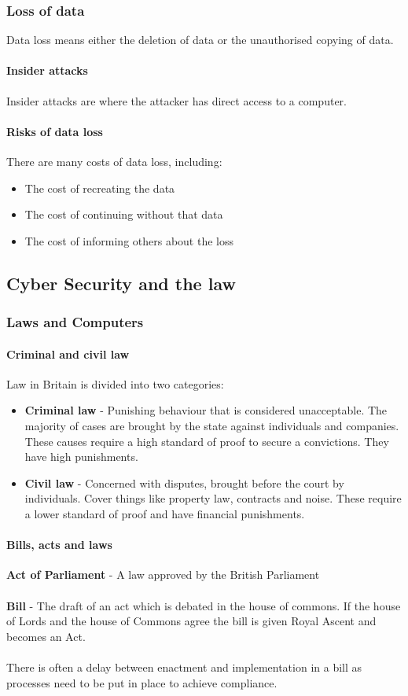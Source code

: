 \documentclass{article}[18pt]
\begin{document}
\subsubsection{Loss of data}
Data loss means either the deletion of data or the unauthorised copying of data.
\paragraph{Insider attacks}
Insider attacks are where the attacker has direct access to a computer.
\paragraph{Risks of data loss}
There are many costs of data loss, including:
\begin{itemize}
\item The cost of recreating the data
\item The cost of continuing without that data
\item The cost of informing others about the loss
\end{itemize}
\subsection{Cyber Security and the law}
\subsubsection{Laws and Computers}
\paragraph{Criminal and civil law}
Law in Britain is divided into two categories:
\begin{itemize}
\item \textbf{Criminal law} - Punishing behaviour that is considered unacceptable. The majority of cases are brought by the state against individuals and companies. These causes require a high standard of proof to secure a convictions. They have high punishments.
\item \textbf{Civil law} - Concerned with disputes, brought before the court by individuals. Cover things like property law, contracts and noise. These require a lower standard of proof and have financial punishments.
\end{itemize}
\paragraph{Bills, acts and laws}
\textbf{Act of Parliament} - A law approved by the British Parliament\\
\\
\textbf{Bill} - The draft of an act which is debated in the house of commons. If the house of Lords and the house of Commons agree the bill is given Royal Ascent and becomes an Act.\\
\\
There is often a delay between enactment and implementation in a bill as processes need to be put in place to achieve compliance.
\end{document}
